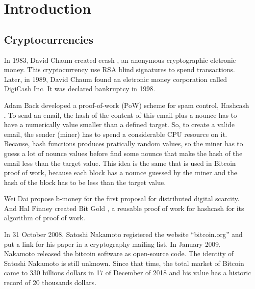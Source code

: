 \documentclass[12pt]{article}
\begin{document}

\tableofcontents
\pagebreak

\renewcommand{\thesection}{\arabic{section}}
\section{Introduction}

\subsection{Cryptocurrencies}

In 1983, David Chaum created ecash \cite{panurach1996money} , an anonymous cryptographic eletronic money.
This cryptocurrency use RSA blind signatures \cite{chaum1983blind} to spend transactions.
Later, in 1989, David Chaum found an eletronic money corporation called DigiCash Inc.
It was declared bankruptcy in 1998.

Adam Back developed a proof-of-work (PoW) scheme for spam control, Hashcash \cite{back2002hashcash}.
To send an email, the hash of the content of this email plus a nounce has to have a numerically value smaller than a defined target.
So, to create a valide email, the sender (miner) has to spend a considerable CPU resource on it.
Because, hash functions produces pratically random values, so the miner has to guess a lot of nounce values before find some nounce that make the hash of the email less than the target value.
This idea is the same that is used in Bitcoin proof of work, because each block has a nounce guessed by the miner and the hash of the block has to be less than the target value.

Wei Dai propose b-money \cite{dai1998b} for the first proposal for distributed digital scarcity.
And Hal Finney created Bit Gold \cite{wallace2011rise}, a reusable proof of work for hashcash for its algorithm of proof of work.

In 31 October 2008, Satoshi Nakamoto registered the website ``bitcoin.org'' and put a link for his paper \cite{nakamoto2008bitcoin} in a cryptography mailing list.
In January 2009, Nakamoto released the bitcoin software as open-source code.
The identity of Satoshi Nakamoto is still unknown.
Since that time, the total market of Bitcoin came to 330 billions dollars in 17 of December of 2018
and his value has a historic record of 20 thousands dollars.
\end{document}
